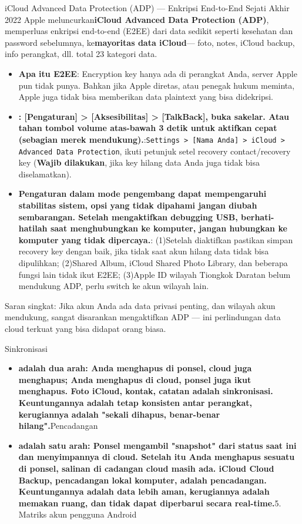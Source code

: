 \begin{tcbwarn}{iCloud Advanced Data Protection (ADP) — Enkripsi End-to-End Sejati}
Akhir 2022 Apple meluncurkan\textbf{iCloud Advanced Data Protection (ADP)}, memperluas enkripsi end-to-end (E2EE) dari data sedikit seperti kesehatan dan password sebelumnya, ke\textbf{mayoritas data iCloud}— foto, notes, iCloud backup, info perangkat, dll. total 23 kategori data.

\begin{itemize}
  \item \textbf{Apa itu E2EE}: Encryption key hanya ada di perangkat Anda, server Apple pun tidak punya. Bahkan jika Apple diretas, atau penegak hukum meminta, Apple juga tidak bisa memberikan data plaintext yang bisa didekripsi.
  \item \textbf{: [Pengaturan] > [Aksesibilitas] > [TalkBack], buka sakelar. Atau tahan tombol volume atas-bawah 3 detik untuk aktifkan cepat (sebagian merek mendukung).}:\texttt{Settings > [Nama Anda] > iCloud > Advanced Data Protection}, ikuti petunjuk setel recovery contact/recovery key (\textbf{Wajib dilakukan}, jika key hilang data Anda juga tidak bisa diselamatkan).
  \item \textbf{Pengaturan dalam mode pengembang dapat mempengaruhi stabilitas sistem, opsi yang tidak dipahami jangan diubah sembarangan. Setelah mengaktifkan debugging USB, berhati-hatilah saat menghubungkan ke komputer, jangan hubungkan ke komputer yang tidak dipercaya.}: (1)Setelah diaktifkan pastikan simpan recovery key dengan baik, jika tidak saat akun hilang data tidak bisa dipulihkan; (2)Shared Album, iCloud Shared Photo Library, dan beberapa fungsi lain tidak ikut E2EE; (3)Apple ID wilayah Tiongkok Daratan belum mendukung ADP, perlu switch ke akun wilayah lain.
\end{itemize}

Saran singkat: Jika akun Anda ada data privasi penting, dan wilayah akun mendukung, sangat disarankan mengaktifkan ADP — ini perlindungan data cloud terkuat yang bisa didapat orang biasa.

\end{tcbwarn}


Sinkronisasi

\begin{itemize}
  \item \textbf{adalah dua arah: Anda menghapus di ponsel, cloud juga menghapus; Anda menghapus di cloud, ponsel juga ikut menghapus. Foto iCloud, kontak, catatan adalah sinkronisasi. Keuntungannya adalah tetap konsisten antar perangkat, kerugiannya adalah "sekali dihapus, benar-benar hilang".}Pencadangan
  \item \textbf{adalah satu arah: Ponsel mengambil "snapshot" dari status saat ini dan menyimpannya di cloud. Setelah itu Anda menghapus sesuatu di ponsel, salinan di cadangan cloud masih ada. iCloud Cloud Backup, pencadangan lokal komputer, adalah pencadangan. Keuntungannya adalah data lebih aman, kerugiannya adalah memakan ruang, dan tidak dapat diperbarui secara real-time.}5. Matriks akun pengguna Android
\end{itemize}

